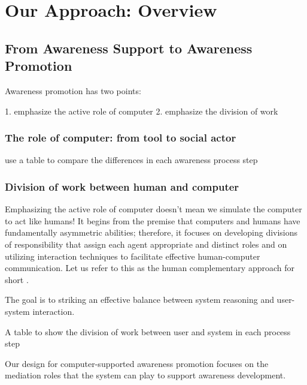 \graphicspath{{Figures/}}

\chapter{Our Approach: Overview} %
\label{cha:computational_framework}

\section{From Awareness Support to Awareness Promotion} %
\label{sec:from_support_to_promotion}

Awareness promotion has two points: 

1. emphasize the active role of computer
2. emphasize the division of work

\subsection{The role of computer: from tool to social actor} %
\label{sub:the_role_of_computer}
use a table to compare the differences in each awareness process step

\subsection{Division of work between human and computer} %
\label{sub:division_of_work_between_human_and_computer}
Emphasizing the active role of computer doesn't mean we simulate the computer to act like humans! It begins from the premise that computers and humans have fundamentally asymmetric abilities; therefore, it focuses on developing divisions of responsibility that assign each agent appropriate and distinct roles and on utilizing interaction techniques to facilitate effective human-computer communication. Let us refer to this as the human complementary approach for short \cite{Terveen1995}.

The goal is to striking an effective balance between system reasoning and user-system interaction.

A table to show the division of work between user and system in each process step

Our design for computer-supported awareness promotion focuses on the mediation roles that the system can play to support awareness development. 

